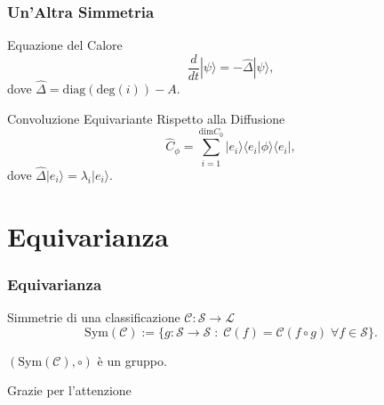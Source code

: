 \documentclass[xcolor=dvipsnames]{beamer}
\newcommand{\mc}[1]{\mathcal{#1}}
\begin{document}
\begin{frame}
    \frametitle{Un'Altra Simmetria}
    \begin{block}{Equazione del Calore}
        \[ \frac{d}{dt} | \psi \rangle = -\widehat{\Delta} | \psi \rangle , \]
        dove $\widehat{\Delta} = \text{diag}(\text{deg}(i))-A$.
    \end{block}
    \begin{block}{Convoluzione Equivariante Rispetto alla Diffusione}
        \[ \widehat{C}_\phi = \sum_{i = 1}^{\text{dim} C_0} | e_i \rangle \langle e_i | \phi \rangle \langle e_i |,  \]
        dove $\widehat{\Delta} | e_i \rangle = \lambda_i | e_i \rangle $.
    \end{block}
\end{frame}

\section{Equivarianza}

\begin{frame}
    \frametitle{Equivarianza}
    \begin{block}{Simmetrie di una classificazione $ \mc{C} : \mc{S} \to \mc{L}$ }
       \[ \text{Sym}(\mc{C}) := \{ g : \mc{S} \to \mc{S} \; : \; \mc{C}(f) = \mc{C}(f \circ g) \; \forall f \in \mc{S} \} .\]
    \end{block}
    \begin{center}
    \Large $(\text{Sym}(\mc{C}), \circ)$ è un gruppo. 
    \end{center}
\end{frame}

\begin{frame}
    \begin{center}
        \Huge
        Grazie per l'attenzione
    \end{center}
\end{frame}
\end{document}
